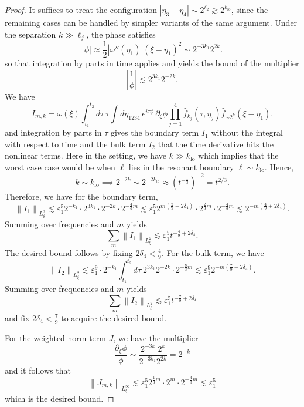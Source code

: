 \documentclass[reqno,english,11pt]{amsart}
\newcommand{\eps}{\varepsilon}
\newcommand{\snorm}[1]{\left\|#1\right\|}
\theoremstyle{definition}
\numberwithin{equation}{section}
\begin{document}
\begin{proof}
It suffices to treat the configuration
$|\eta_3-\eta_4|\sim 2^{\ell_2}\gtrsim 2^{k_{\operatorname{lo}}}$, since the remaining cases can be handled by simpler variants of the same argument. Under the separation $k\gg \ell_j$, the phase satisfies
$$|\phi| \approx \frac{1}{2}|\omega''(\eta_1)|(\xi - \eta_1)^2 \sim 2^{-3k_1} 2^{2k}.$$
so that integration by parts in time applies and yields the bound of the multiplier
$$\left| \frac{1}{\phi} \right| \lesssim 2^{3k_1} 2^{-2k}.$$
We have
\begin{equation*}
    I_{m, k} = \omega(\xi)\int_{t_1}^{t_2} d\tau \ \tau \int d\eta_{1234}\, e^{i\tau\phi} \, \partial_\xi \phi \prod^4_{j=1}\hat{f}_{k_j}(\tau,\eta_j)\hat{f}_{\sim 2^k}(\xi-\eta_1) .
\end{equation*}
and integration by parts in $\tau$ gives the boundary term $I_1$ without the integral with respect to time and the bulk term $I_2$ that the time derivative hits the nonlinear terms. Here in the setting, we have $k\gg k_{\operatorname{lo}}$ which implies that the worst case case would be when $\ell$ lies in the resonant boundary $\ell\sim k_{\operatorname{lo}}$. Hence, $$  k \sim k_{\operatorname{lo}} \implies 2^{-2k} \sim 2^{-2k_{lo}} \approx (t^{-\frac{1}{3}})^{-2} = t^{2/3}.$$
Therefore, we have for the boundary term,
$$\snorm{I_1}_{L^2_\xi} \lesssim \eps_1^5 2^{-k_1}\cdot 2^{3k_1}\cdot 2^{-2k} \cdot 2^{-\frac{4}{3}m}\lesssim \eps_1^5 2^{m(\frac{2}{9}-2\delta_4)}\cdot 2^{\frac{2}{3}m}\cdot 2^{-\frac{4}{3}m}\lesssim 2^{-m(\frac{4}{9}+2\delta_4)}.$$ 
Summing over frequencies and $m$ yields
$$\sum_m \snorm{I_1}_{L^2_\xi}\lesssim \eps_1^5 t^{-\frac{4}{9}+2\delta_4}.$$
The desired bound follows by fixing $2\delta_4<\frac{4}{9}$. For the bulk term, we have
$$\snorm{I_2}_{L^2_\xi}\lesssim \eps^9_1\cdot 2^{-k_1}\int^{t_2}_{t_1} d\tau\  2^{3k_1}2^{-2k}\cdot 2^{-\frac{8}{3}m}\lesssim \eps^9_1 2^{-m(\frac 79-2\delta_4)}.$$
Summing over frequencies and $m$ yields
$$\sum_m \snorm{I_2}_{L^2_\xi}\lesssim \eps_1^5 t^{-\frac{7}{9}+2\delta_4}$$
and fix $2\delta_4 <\frac{7}{9}$ to acquire the desired bound. 

For the weighted norm term $J$, we have the multiplier
$$\frac{\partial_\xi \phi}{\phi} \sim \frac{2^{-3k_1} 2^k}{2^{-3k_1} 2^{2k}} = 2^{-k}$$
and it follows that
$$\snorm{J_{m,k}}_{L^\infty_\xi}\lesssim \eps_1^5 2^{\frac{1}{3}m}\cdot 2^m \cdot 2^{-\frac{4}{3}m}\lesssim \eps_1^5$$
which is the desired bound.
\end{proof}
\end{document}
